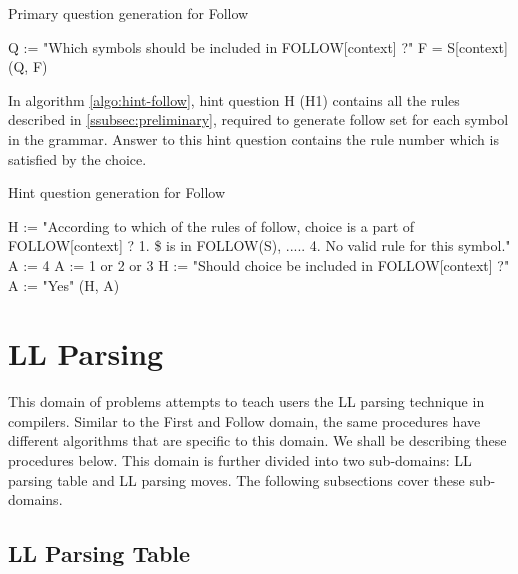 \begin{algorithm}
\caption{Primary question generation for Follow}
\label{algo:primary-follow}
\begin{algorithmic}[1]
\State Q := "Which symbols should be included in FOLLOW[context] ?"
\State F = S[context]
\State \Return (Q, F)
\EndFunction
\end{algorithmic}
\end{algorithm}

In algorithm \ref{algo:hint-follow}, hint question H (H1) contains all the rules described in \ref{ssubsec:preliminary}, required to generate follow set for each symbol in the grammar. Answer to this hint question contains the rule number which is satisfied by the choice.

\begin{algorithm}
\caption{Hint question generation for Follow}
\label{algo:hint-follow}
\begin{algorithmic}[1]
\State H := "According to which of the rules of follow, choice is a part of FOLLOW[context] ? 1. \$ is in FOLLOW(S), ..... 4. No valid rule for this symbol."
\State A := 4
\State A := 1 or 2 or 3
\EndIf
{}
\State H := "Should choice be included in FOLLOW[context] ?"
\State A := "Yes"
\EndIf
\State \Return (H, A)
\EndFunction
\end{algorithmic}
\end{algorithm}

\section{LL Parsing}
\label{llparsing}

This domain of problems attempts to teach users the LL parsing technique in compilers. Similar to the First and Follow domain, the same procedures have different algorithms that are specific to this domain. We shall be describing these procedures below. This domain is further divided into two sub-domains: LL parsing table and LL parsing moves. The following subsections cover these sub-domains. 

\subsection{LL Parsing Table}
\label{subsec:lltable}

